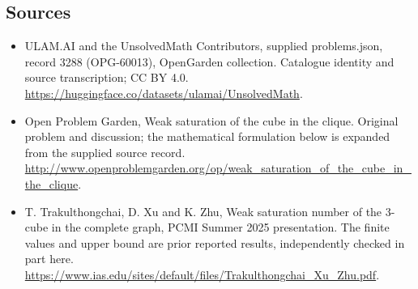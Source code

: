 \documentclass[11pt,a4paper]{article}
\begin{document}
\subsection{Sources}
\begin{itemize}
\item[S1] ULAM.AI and the UnsolvedMath Contributors, supplied problems.json, record 3288 (OPG-60013), OpenGarden collection. Catalogue identity and source transcription; CC BY 4.0.
\url{https://huggingface.co/datasets/ulamai/UnsolvedMath}.
\item[S2] Open Problem Garden, Weak saturation of the cube in the clique. Original problem and discussion; the mathematical formulation below is expanded from the supplied source record.
\url{http://www.openproblemgarden.org/op/weak_saturation_of_the_cube_in_the_clique}.
\item[S3] T. Trakulthongchai, D. Xu and K. Zhu, Weak saturation number of the 3-cube in the complete graph, PCMI Summer 2025 presentation. The finite values and upper bound are prior reported results, independently checked in part here.
\url{https://www.ias.edu/sites/default/files/Trakulthongchai_Xu_Zhu.pdf}.
\end{itemize}
\end{document}
